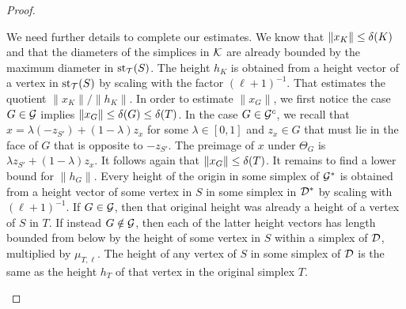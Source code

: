 \documentclass[10pt,a4paper]{article}
\begin{document}
\begin{proof}
\begin{itemize}
        We need further details to complete our estimates. 
        We know that $\| x_K \| \leq {\delta}(K)$ and that the diameters of the simplices in ${\mathcal K}$ are already bounded by the maximum diameter in $\operatorname{st}_{{\mathcal T}}(S)$. The height $h_{K}$ is obtained from a height vector of a vertex in $\operatorname{st}_{{\mathcal T}}(S)$ by scaling with the factor $(\ell+1)^{-1}$.
        That estimates the quotient $\| x_K \| / \| h_K \|$. 
        In order to estimate $\|x_{G}\|$, we first notice the case $G \in {\mathcal G}$ implies $\|x_{G}\| \leq {\delta}(G) \leq {\delta}(T)$. 
        In the case $G \in {\mathcal G}^{c}$, we recall that $x = \lambda (-z_{S'}) + (1-\lambda) z_{x}$ for some $\lambda \in [0,1]$ and $z_{x} \in G$
        that must lie in the face of $G$ that is opposite to $-z_{S'}$. 
        The preimage of $x$ under $\Theta_{{G}}$ is $\lambda z_{S'} + (1-\lambda) z_{x}$. 
        It follows again that $\|x_{G}\| \leq {\delta}(T)$. 
        It remains to find a lower bound for $\| h_{G} \|$.
        Every height of the origin in some simplex of ${\mathcal G}^\ast$ is obtained from a height vector of some vertex in $S$ in some simplex in ${\mathcal D}^\ast$
        by scaling with $(\ell+1)^{-1}$. If $G \in {\mathcal G}$, then that original height was already a height of a vertex of $S$ in $T$. 
        If instead $G \notin {\mathcal G}$, then each of the latter height vectors has length bounded from below by the height of some vertex in $S$ within a simplex of ${\mathcal D}$, multiplied by $\mu_{T,\ell}$. The height of any vertex of $S$ in some simplex of ${\mathcal D}$ is the same as the height $h_T$ of that vertex in the original simplex $T$. 

\end{itemize}
\end{proof}
\end{document}
